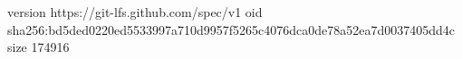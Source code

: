 version https://git-lfs.github.com/spec/v1
oid sha256:bd5ded0220ed5533997a710d9957f5265c4076dca0de78a52ea7d0037405dd4c
size 174916
